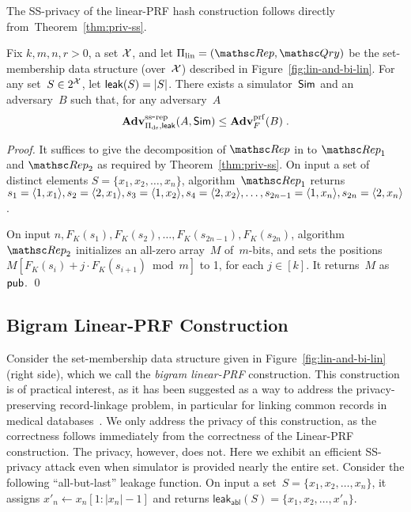 The SS-privacy of the linear-PRF hash construction follows directly from~Theorem~\ref{thm:priv-ss}.
\begin{theorem}\label{thm:lin-privacy}
Fix $k,m,n,r>0$, a set ${\cal X}$, and let $\setprim_{\mathrm{lin}}= (\Rep, \Qry)$ be the set-membership data structure (over~${\cal X}$) described in Figure~\ref{fig:lin-and-bi-lin}. For any set~$S \in 2^{{\cal X}}$, let ${\sf leak}(S)=|S|$.  There exists a simulator~${\sf Sim}$ and an adversary~$B$ such that, for any adversary~$A$
\[
\mathrm{\mathbf{Adv}}^{\mathrm{ss\mbox{-}rep}}_{\Pi_{\mathrm{ds}},{\sf leak}}(A,{\sf Sim}) \leq  \mathbf{Adv}^{\mathrm{prf}}_{F}(B)\;.
\]
\end{theorem}
\begin{proof}
It suffices to give the decomposition of $\Rep$ in to $\Rep_1$ and $\Rep_2$ as required by Theorem~\ref{thm:priv-ss}.
On input a set of distinct elements
$S=\{x_1,x_2,\ldots,x_n\}$, algorithm~$\Rep_1$ returns $s_1=\langle 1,x_1 \rangle, s_2=\langle 2,x_1 \rangle, s_3 = \langle 1,x_2\rangle, s_4=\langle 2,x_2 \rangle,\ldots,\linebreak s_{2n-1}=\langle 1,x_n \rangle, s_{2n}=\langle 2,x_n \rangle$.

On input $n,F_K(s_1),F_K(s_2),\ldots,F_K(s_{2n-1}) , F_K(s_{2n})$, algorithm $\Rep_2$ initializes an all-zero array~$M$ of~$m$-bits, and sets the positions $M[F_K(s_i)+j\cdot F_K(s_{i+1})\bmod m]$ to 1, for each $j \in [k]$.  It returns~$M$ as ${\sf pub}$. \hfill\qed
\end{proof}


\subsection{Bigram Linear-PRF Construction}
Consider the set-membership data structure given in Figure~\ref{fig:lin-and-bi-lin} (right side), which we call the \emph{bigram linear-PRF} construction.  This construction is of practical interest, as it has been suggested as a way to address the privacy-preserving record-linkage problem, in particular for linking common records in medical databases~\cite{niedermeyer2014cryptanalysis,schnell2011novel}.
We only address the privacy of this construction, as the correctness follows immediately from the correctness of the Linear-PRF construction.  The privacy, however, does not.  Here we exhibit an efficient SS-privacy attack even when simulator is provided nearly the entire set.  Consider the following ``all-but-last'' leakage function.  On input a set~$S=\{x_1,x_2,\ldots,x_n\}$, it assigns $x'_n \gets x_n[1:|x_n|-1]$ and returns $\mathsf{leak_{abl}}(S)=\{x_1,x_2,\ldots,x'_n\}$.  


